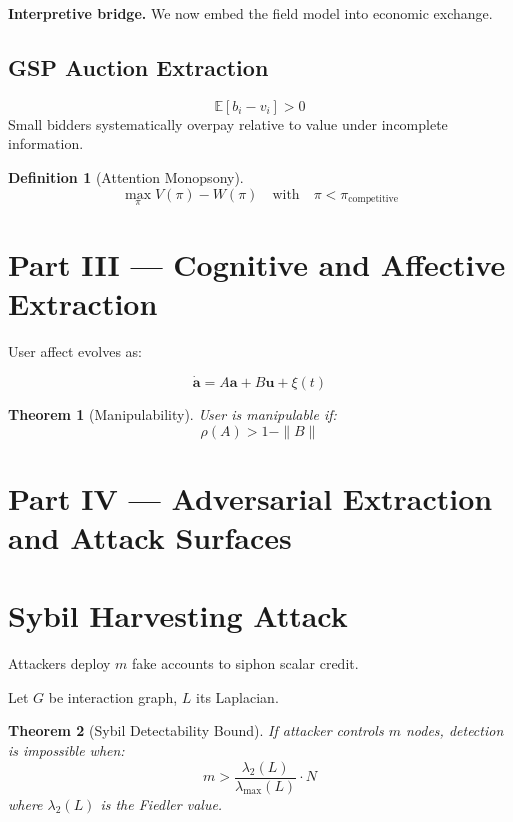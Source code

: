 \documentclass[11pt,a4paper]{article}
\theoremstyle{plain}
\newtheorem{theorem}{Theorem}[section]
\theoremstyle{definition}
\newtheorem{definition}{Definition}[section]
\theoremstyle{remark}
\begin{document}
\noindent\textbf{Interpretive bridge.}  
We now embed the field model into economic exchange.

\subsection{GSP Auction Extraction}

\[
\mathbb{E}[b_i - v_i] > 0
\]
Small bidders systematically overpay relative to value under incomplete information.

\begin{definition}[Attention Monopsony]
\[
\max_\pi V(\pi) - W(\pi)
\quad \text{with}\quad
\pi < \pi_{\text{competitive}}
\]
\end{definition}


\section*{Part III — Cognitive and Affective Extraction}

User affect evolves as:

\[
\dot{\mathbf{a}} = A\mathbf{a} + B\mathbf{u} + \xi(t)
\]

\begin{theorem}[Manipulability]
User is manipulable if:
\[
\rho(A) > 1 - \|B\|
\]
\end{theorem}


\section*{Part IV — Adversarial Extraction and Attack Surfaces}

\section{Sybil Harvesting Attack}

Attackers deploy $m$ fake accounts to siphon scalar credit.

Let $G$ be interaction graph, $L$ its Laplacian.

\begin{theorem}[Sybil Detectability Bound]
If attacker controls $m$ nodes, detection is impossible when:
\[
m > \frac{\lambda_2(L)}{\lambda_{\max}(L)} \cdot N
\]
where $\lambda_2(L)$ is the Fiedler value.
\end{theorem}
\end{document}

